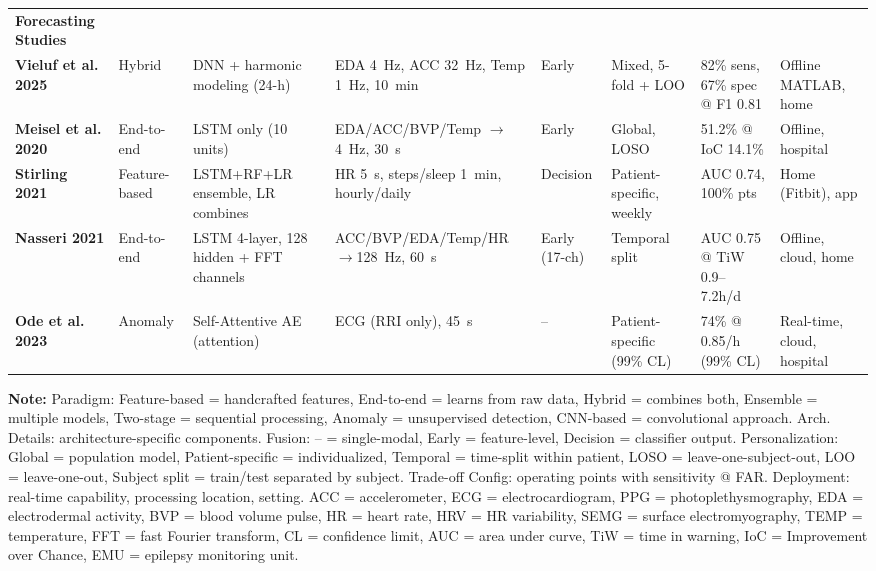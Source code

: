 \begin{landscape}
\begin{table}[htbp]
{\begin{tabular}{@{} l >{\raggedright}p{1.4cm} >{\raggedright}p{1.9cm} >{\raggedright}p{1.7cm} >{\centering}p{0.9cm} >{\raggedright}p{1.4cm} >{\raggedright}p{1.7cm} >{\raggedright\arraybackslash}p{1.5cm} @{}}
\addlinespace
\textbf{Forecasting Studies} \\
\textbf{Vieluf et al. 2025} & Hybrid & DNN + harmonic modeling (24-h) & EDA 4~Hz, ACC 32~Hz, Temp 1~Hz, 10~min & Early & Mixed, 5-fold + LOO & 82\% sens, 67\% spec @ F1 0.81 & Offline MATLAB, home \\
\textbf{Meisel et al. 2020} & End-to-end & LSTM only (10 units) & EDA/ACC/BVP/Temp $\to$4~Hz, 30~s & Early & Global, LOSO & 51.2\% @ IoC 14.1\% & Offline, hospital \\
\textbf{Stirling 2021} & Feature-based & LSTM+RF+LR ensemble, LR combines & HR 5~s, steps/sleep 1~min, hourly/daily & Decision & Patient-specific, weekly & AUC 0.74, 100\% pts & Home (Fitbit), app \\
\textbf{Nasseri 2021} & End-to-end & LSTM 4-layer, 128 hidden + FFT channels & ACC/BVP/EDA/Temp/HR $\to$128~Hz, 60~s & Early (17-ch) & Temporal split & AUC 0.75 @ TiW 0.9--7.2h/d & Offline, cloud, home \\
\textbf{Ode et al. 2023} & Anomaly & Self-Attentive AE (attention) & ECG (RRI only), 45~s & -- & Patient-specific (99\% CL) & 74\% @ 0.85/h (99\% CL) & Real-time, cloud, hospital \\
\bottomrule
\end{tabular}%
}
\par\medskip
\scriptsize
\textbf{Note:} Paradigm: Feature-based = handcrafted features, End-to-end = learns from raw data, Hybrid = combines both, Ensemble = multiple models, Two-stage = sequential processing, Anomaly = unsupervised detection, CNN-based = convolutional approach. Arch. Details: architecture-specific components. Fusion: -- = single-modal, Early = feature-level, Decision = classifier output. Personalization: Global = population model, Patient-specific = individualized, Temporal = time-split within patient, LOSO = leave-one-subject-out, LOO = leave-one-out, Subject split = train/test separated by subject. Trade-off Config: operating points with sensitivity @ FAR. Deployment: real-time capability, processing location, setting. ACC = accelerometer, ECG = electrocardiogram, PPG = photoplethysmography, EDA = electrodermal activity, BVP = blood volume pulse, HR = heart rate, HRV = HR variability, SEMG = surface electromyography, TEMP = temperature, FFT = fast Fourier transform, CL = confidence limit, AUC = area under curve, TiW = time in warning, IoC = Improvement over Chance, EMU = epilepsy monitoring unit.
\end{table}
\end{landscape}
